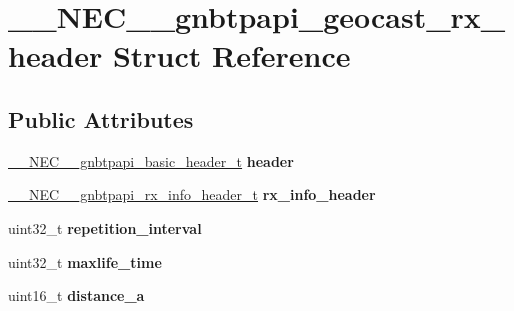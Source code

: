 \hypertarget{struct____NEC____gnbtpapi__geocast__rx__header}{\section{\-\_\-\-\_\-\-N\-E\-C\-\_\-\-\_\-gnbtpapi\-\_\-geocast\-\_\-rx\-\_\-header \-Struct \-Reference}
\label{struct____NEC____gnbtpapi__geocast__rx__header}
}
\subsection*{\-Public \-Attributes}
\begin{DoxyCompactItemize}
\item 
\hypertarget{struct____NEC____gnbtpapi__geocast__rx__header_a744b9e4cb7a39905c9bb9f93c021362a}{\hyperlink{struct____NEC____gnbtpapi__basic__header}{\-\_\-\-\_\-\-N\-E\-C\-\_\-\-\_\-gnbtpapi\-\_\-basic\-\_\-header\-\_\-t} {\bfseries header}}\label{struct____NEC____gnbtpapi__geocast__rx__header_a744b9e4cb7a39905c9bb9f93c021362a}

\item 
\hypertarget{struct____NEC____gnbtpapi__geocast__rx__header_acbb8bbbae5811698cb9c45b15a3cbecf}{\hyperlink{struct____NEC____gnbtpapi__rx__info__header}{\-\_\-\-\_\-\-N\-E\-C\-\_\-\-\_\-gnbtpapi\-\_\-rx\-\_\-info\-\_\-header\-\_\-t} {\bfseries rx\-\_\-info\-\_\-header}}\label{struct____NEC____gnbtpapi__geocast__rx__header_acbb8bbbae5811698cb9c45b15a3cbecf}

\item 
\hypertarget{struct____NEC____gnbtpapi__geocast__rx__header_a1a555b3c9b1a2211d64d19c23547d660}{uint32\-\_\-t {\bfseries repetition\-\_\-interval}}\label{struct____NEC____gnbtpapi__geocast__rx__header_a1a555b3c9b1a2211d64d19c23547d660}

\item 
\hypertarget{struct____NEC____gnbtpapi__geocast__rx__header_a319e9269350eced9bdfffd763cd5d8c2}{uint32\-\_\-t {\bfseries maxlife\-\_\-time}}\label{struct____NEC____gnbtpapi__geocast__rx__header_a319e9269350eced9bdfffd763cd5d8c2}

\item 
\hypertarget{struct____NEC____gnbtpapi__geocast__rx__header_ada385a3c80f24ac7045132b6b6bf3367}{uint16\-\_\-t {\bfseries distance\-\_\-a}}\label{struct____NEC____gnbtpapi__geocast__rx__header_ada385a3c80f24ac7045132b6b6bf3367}


\end{DoxyCompactItemize}
